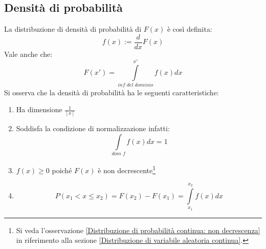 \documentclass[11pt,a4paper]{book}
\begin{document}
\subsection{Densità di probabilità}  
La distribuzione di densità di probabilità di $ F(x) $ è così definita:
\begin{equation}
f(x):= \frac{d}{dx}F(x) 
\end{equation}
Vale anche che:
\begin{equation}
F(x') = \int\limits_{\textit{inf del dominio}}^{x'}f(x)dx
\end{equation}
Si osserva che la densità di probabilità ha le seguenti caratteristiche:
\begin{enumerate}
\item Ha dimensione $ \frac{1}{[x]} $
\item Soddisfa la condizione di normalizzazione infatti:
\begin{equation}
\int\limits_{\textit{dom f}}f(x)dx = 1
\end{equation}
\item $ f(x)\geq 0 $ poiché $ F(x) $ è non decrescente\footnote{Si veda l'osservazione \ref{Distribuzione di probabilità continua: non decrescenza} in riferimento alla sezione \ref{Distribuzione di variabile aleatoria continua}.}
\item 
\begin{equation}
P(x_1 < x \leq x_2) = F(x_2)-F(x_1) = \int\limits_{x_1}^{x_2}f(x)dx
\end{equation}
\end{enumerate}
\end{document}
